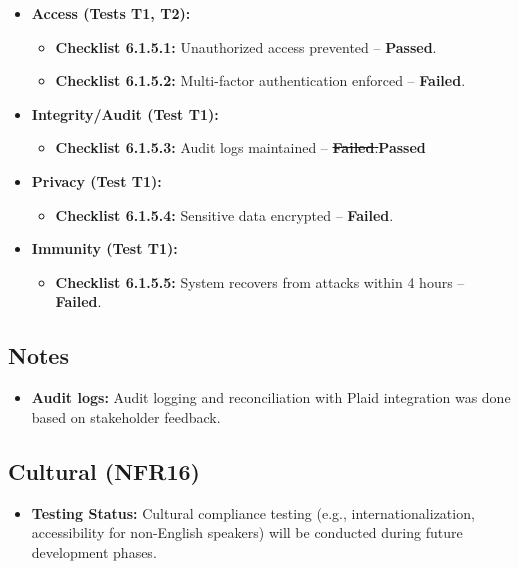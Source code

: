 \documentclass[12pt, titlepage]{article}
\begin{document}
\begin{itemize}
    \item \textbf{Access (Tests T1, T2):}  
    \begin{itemize}
        \item \textbf{Checklist 6.1.5.1:} Unauthorized access prevented – \textbf{Passed}.  
        \item \textbf{Checklist 6.1.5.2:} Multi-factor authentication enforced – \textbf{Failed}.  
    \end{itemize}
    
    \item \textbf{Integrity/Audit (Test T1):}  
    \begin{itemize}
        \item \textbf{Checklist 6.1.5.3:} Audit logs maintained – \st{\textbf{Failed}.}\textbf{Passed}
    \end{itemize}
    
    \item \textbf{Privacy (Test T1):}  
    \begin{itemize}
        \item \textbf{Checklist 6.1.5.4:} Sensitive data encrypted – \textbf{Failed}.  
    \end{itemize}
    
    \item \textbf{Immunity (Test T1):}  
    \begin{itemize}
        \item \textbf{Checklist 6.1.5.5:} System recovers from attacks within 4 hours – \textbf{Failed}.  
    \end{itemize}
\end{itemize}
\subsection*{Notes}
\begin{itemize}
    \item \textbf{Audit logs:} Audit logging and reconciliation with Plaid integration was done based on stakeholder feedback.
\end{itemize}

\subsection{Cultural (NFR16)}  
\label{nfr16}

\begin{itemize}
    \item \textbf{Testing Status:} Cultural compliance testing (e.g., internationalization, accessibility for non-English speakers) will be conducted during future development phases.  
\end{itemize}
\end{document}
